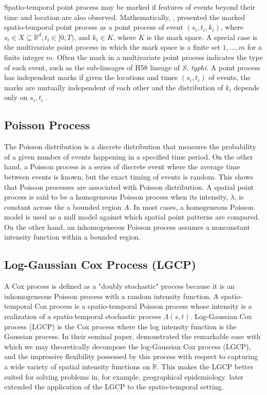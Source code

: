 Spatio-temporal point process may be marked if features of events beyond their time and location are also observed. Mathematically, \citet{Reinhart:2018}, presented the marked spatio-temporal point process  as a point process of event ${(s_i,t_i,k_i)}$, where $s_i \in X \subseteq \mathbb{R}^d, t_i \in [0,T)$, and $k_i \in K$, where $K$ is the mark space. A special case is the multivariate point process in which the mark space is a finite set ${1,...,m}$ for a finite integer $m$. Often the mark in a multivariate point process indicates the type of each event, such as the sub-lineages of H58 lineage of \textit{S. typhi}. A point process has independent marks if given the locations and times ${(s_i,t_i)}$ of events, the marks are mutually independent of each other and the distribution of $k_i$ depends only on ${s_i,t_i}$ \citep{Reinhart:2018}.

\subsection{Poisson Process}

The Poisson distribution is a discrete distribution that measures the probability of a given number of events happening in a specified time period. On the other hand, a Poisson process is a series of discrete event where the average time between events is known, but the exact timing of events is random. This shows that Poisson processes are associated with Poisson distribution. A spatial point process is said to be a homogeneous Poisson process when its intensity, $\lambda$, is constant across the a bounded region $A$. In most cases, a homogeneous Poisson model is used as a null model against which spatial point patterns are compared. On the other hand, an inhomogeneous Poisson process assumes a nonconstant intensity function within a bounded region.

\subsection{Log-Gaussian Cox Process (LGCP)}

A Cox process is defined as a "doubly stochastic" process  because it is an inhomogeneous Poisson process with a random intensity function. A spatio-temporal Cox process is a spatio-temporal Poisson process whose intensity is a realization of a spatio-temporal stochastic process $\Lambda(s,t)$. Log-Gaussian Cox process (LGCP) is the Cox process where the log intensity function is the Gaussian process. In their seminal paper, \citet{Moller:1998} demonstrated the remarkable ease with which we may theoretically decompose the log-Gaussian Cox process (LGCP), and the impressive flexibility possessed by this process with respect to capturing a wide variety of spatial intensity functions on $\mathbb{R}$. This makes the LGCP better suited for solving problems in, for example, geographical epidemiology.  \citet{Diggle:2001} later extended the application of the LGCP to the spatio-temporal setting.

